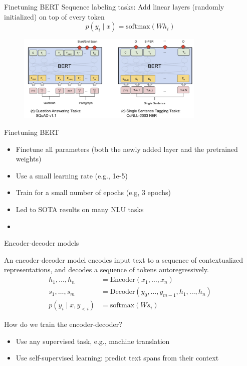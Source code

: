 \documentclass[usenames,dvipsnames,notes,11pt,aspectratio=169,hyperref={colorlinks=true, linkcolor=blue}]{beamer}
\begin{document}
\begin{frame}
    {Finetuning BERT}
        Sequence labeling tasks:
            Add linear layers (randomly initialized) on top of every token 
            $$
            p(y_i \mid x) = \mathrm{softmax}(Wh_{i})
            $$
            \begin{figure}
                \includegraphics[width=0.8\textwidth]{figures/bert-seq-label}
            \end{figure}
\end{frame}

\begin{frame}
    {Finetuning BERT}

    \begin{itemize}
        \item Finetune all parameters (both the newly added layer and the pretrained weights)
        \item Use a small learning rate (e.g., 1e-5)
        \item Train for a small number of epochs (e.g, 3 epochs)
        \item Led to SOTA results on many NLU tasks
        \item {} 
    \end{itemize}
\end{frame}

\begin{frame}
    {Encoder-decoder models}

    An encoder-decoder model encodes input text to a sequence of contextualized representations, and decodes a sequence of tokens autoregressively.
    \begin{align*}
        h_1,\ldots,h_n &= \mathrm{Encoder}(x_1,\ldots,x_n) \\
        s_1,\ldots,s_m &= \mathrm{Decoder}(y_0,\ldots,y_{m-1}, h_1,\ldots,h_n)\\
        p(y_i\mid x, y_{<i}) &= \mathrm{softmax}(Ws_i)
    \end{align*}

    \pause
    How do we train the encoder-decoder?
    \begin{itemize}
        \item Use any supervised task, e.g., machine translation 
        \item Use self-supervised learning: predict text spans from their context 
    \end{itemize}
\end{frame}
\end{document}
